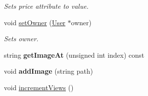\begin{DoxyCompactItemize}
\begin{DoxyCompactList}\small\item\em Sets price attribute to value. \end{DoxyCompactList}\item 
void \hyperlink{class_advertisement_a3333256bc60f96a933970fdfed317116}{set\+Owner} (\hyperlink{class_user}{User} $\ast$owner)
\begin{DoxyCompactList}\small\item\em Sets owner. \end{DoxyCompactList}\item 
\hypertarget{class_advertisement_a260fbb1a64495a5e99591202389744a0}{}string {\bfseries get\+Image\+At} (unsigned int index) const \label{class_advertisement_a260fbb1a64495a5e99591202389744a0}

\item 
\hypertarget{class_advertisement_a3925f5b2411ae7ac00a56f3398ae9353}{}void {\bfseries add\+Image} (string path)\label{class_advertisement_a3925f5b2411ae7ac00a56f3398ae9353}

\item 
\hypertarget{class_advertisement_abd20373813b956bac9a6fd78a4947ebc}{}void \hyperlink{class_advertisement_abd20373813b956bac9a6fd78a4947ebc}{increment\+Views} ()\label{class_advertisement_abd20373813b956bac9a6fd78a4947ebc}


\end{DoxyCompactItemize}
